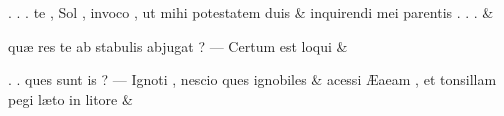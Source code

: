 \documentclass[12pt,onecolumn,twoside,a4paper]{memoir}
\begin{document}
               \begin{pairs}
                  \begin{Leftside}
			\beginnumbering
			\setcounter{stanzaL}{0}
                     
                         \stanza {}.
                              .
                              .
                              te
                              ,
                              Sol
                              ,
                              invoco
                              ,
                              ut
                              mihi
                              potestatem
                              duis & 
                     inquirendi
                              mei
                              parentis
                              .
                              .
                              . \&
                         \stanza {}
                     
                              quæ
                              res
                              te
                              ab
                              stabulis
                              abjugat
                              ?
                              —
                              Certum
                              est
                              loqui \&
                         \stanza {}
                     
                              .
                              .
                              ques
                              sunt
                              is
                              ?
                              —
                              Ignoti
                              ,
                              nescio
                              ques
                              ignobiles \&
                         \stanza {}
                     acessi
                              Æaeam
                              ,
                              et
                              tonsillam
                              pegi
                              læto
                              in
                              litore \&
                         \stanza {}
                     

\end{Leftside}
\end{pairs}
\end{document}
